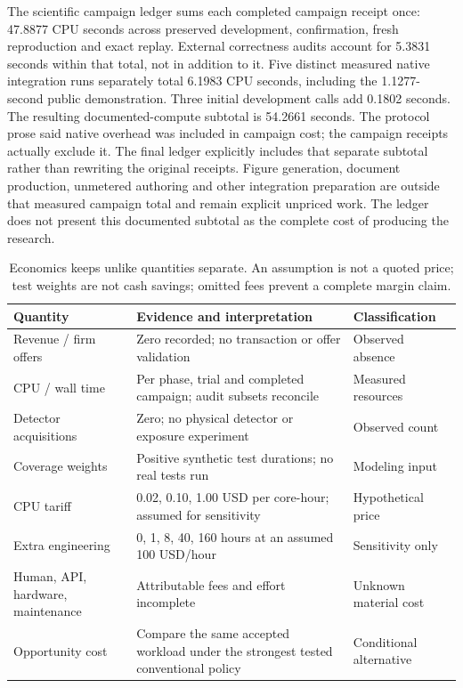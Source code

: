 \documentclass[11pt,letterpaper]{article}
\begin{document}
The scientific campaign ledger sums each completed campaign receipt once: 47.8877 CPU seconds across preserved development, confirmation, fresh reproduction and exact replay. External correctness audits account for 5.3831 seconds within that total, not in addition to it. Five distinct measured native integration runs separately total 6.1983 CPU seconds, including the 1.1277-second public demonstration. Three initial development calls add 0.1802 seconds. The resulting documented-compute subtotal is 54.2661 seconds. The protocol prose said native overhead was included in campaign cost; the campaign receipts actually exclude it. The final ledger explicitly includes that separate subtotal rather than rewriting the original receipts. Figure generation, document production, unmetered authoring and other integration preparation are outside that measured campaign total and remain explicit unpriced work. The ledger does not present this documented subtotal as the complete cost of producing the research.

\begin{table}[htbp]
\centering\small
\begin{tabularx}{\textwidth}{@{}p{1.8in}Yp{1.25in}@{}}
\toprule
Quantity & Evidence and interpretation & Classification \\
\midrule
Revenue / firm offers & Zero recorded; no transaction or offer validation & Observed absence \\
CPU / wall time & Per phase, trial and completed campaign; audit subsets reconcile & Measured resources \\
Detector acquisitions & Zero; no physical detector or exposure experiment & Observed count \\
Coverage weights & Positive synthetic test durations; no real tests run & Modeling input \\
CPU tariff & 0.02, 0.10, 1.00 USD per core-hour; assumed for sensitivity & Hypothetical price \\
Extra engineering & 0, 1, 8, 40, 160 hours at an assumed 100 USD/hour & Sensitivity only \\
Human, API, hardware, maintenance & Attributable fees and effort incomplete & Unknown material cost \\
Opportunity cost & Compare the same accepted workload under the strongest tested conventional policy & Conditional alternative \\
\bottomrule
\end{tabularx}
\caption{Economics keeps unlike quantities separate. An assumption is not a quoted price; test weights are not cash savings; omitted fees prevent a complete margin claim.}
\label{tab:economics}
\end{table}
\end{document}
